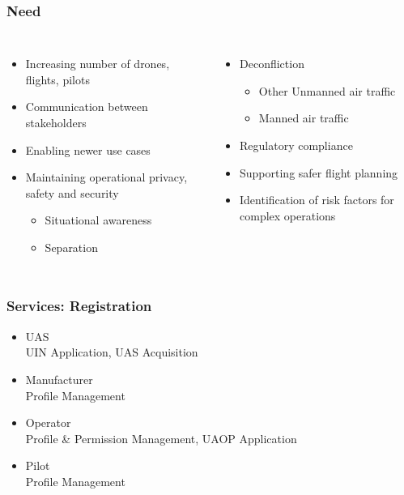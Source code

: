 \documentclass[usenames,dvipsnames,aspectratio=169,serif]{beamer}
\begin{document}
\begin{frame}
   \frametitle{Need}
   \begin{columns}[t]
      \begin{itemize}
         \item Increasing number of drones, flights, pilots
         \item Communication between stakeholders
         \item Enabling newer use cases
         \item Maintaining operational privacy, safety and security
            \begin{itemize}
               \item Situational awareness
               \item Separation
            \end{itemize}
      \end{itemize}
      \begin{itemize}
         \item Deconfliction
            \begin{itemize}
               \item Other Unmanned air traffic
               \item Manned air traffic
            \end{itemize}
         \item Regulatory compliance
         \item Supporting safer flight planning
         \item Identification of risk factors for complex operations
      \end{itemize}
   \end{columns}

\end{frame}


\begin{frame}
   \frametitle{Services: Registration}
   \begin{itemize}
      \item UAS \\
         UIN Application, UAS Acquisition
      \item Manufacturer \\
         Profile Management

      \item Operator \\
         Profile \& Permission Management, UAOP Application

      \item Pilot \\
         Profile Management
   \end{itemize}
\end{frame}
\end{document}

